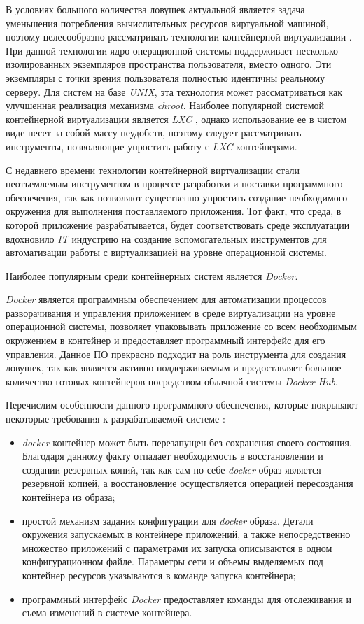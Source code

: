 В условиях большого количества ловушек актуальной является задача уменьшения потребления вычислительных ресурсов виртуальной машиной, поэтому целесообразно рассматривать технологии контейнерной виртуализации \citep{Joy2015}. При данной технологии ядро операционной системы поддерживает несколько изолированных экземпляров пространства пользователя, вместо одного. Эти экземпляры с точки зрения пользователя полностью идентичны реальному серверу. Для систем на базе \textit{UNIX}, эта технология может рассматриваться как улучшенная реализация механизма \textit{chroot}. Наиболее популярной системой контейнерной виртуализации является \textit{LXC} \citep{lxc_doc}, однако использование ее в чистом виде несет за собой массу неудобств, поэтому следует рассматривать инструменты, позволяющие упростить работу с \textit{LXC} контейнерами.

С недавнего времени технологии контейнерной виртуализации стали неотъемлемым инструментом в процессе разработки и поставки программного обеспечения, так как позволяют существенно упростить создание необходимого окружения для выполнения поставляемого приложения. Тот факт, что среда, в которой приложение разрабатывается, будет соответствовать среде эксплуатации вдохновило \textit{IT} индустрию на создание вспомогательных инструментов для автоматизации работы с виртуализацией на уровне операционной системы.

Наиболее популярным среди контейнерных систем является \textit{Docker}.

\textit{Docker} является программным обеспечением для автоматизации процессов разворачивания и управления приложением в среде виртуализации на уровне операционной системы, позволяет упаковывать приложение со всем необходимым окружением в контейнер и предоставляет программный интерфейс для его управления. Данное ПО прекрасно подходит на роль инструмента для создания ловушек, так как является активно поддерживаемым и предоставляет большое количество готовых контейнеров посредством облачной системы \textit{Docker Hub}.

Перечислим особенности данного программного обеспечения, которые покрывают некоторые требования к разрабатываемой системе \citep{Boettiger2015}:

\begin{itemize}
\item  \textit{docker} контейнер может быть перезапущен без сохранения своего состояния. Благодаря данному факту отпадает необходимость в восстановлении и создании резервных копий, так как сам по себе \textit{docker} образ является резервной копией, а восстановление осуществляется  операцией пересоздания контейнера из образа;
\item  простой механизм задания конфигурации для \textit{docker} образа. Детали окружения запускаемых в контейнере приложений, а также непосредственно множество приложений с параметрами их запуска описываются в одном конфигурационном файле. Параметры сети и объемы выделяемых под контейнер ресурсов указываются в команде запуска контейнера;
\item  программный интерфейс \textit{Docker} предоставляет команды для отслеживания и съема изменений в системе контейнера.
\end{itemize}

